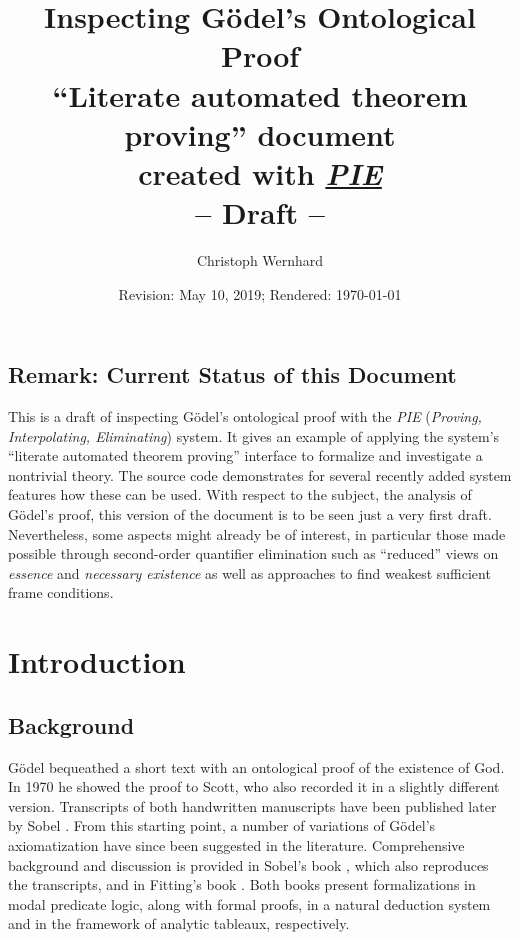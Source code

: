 \documentclass[a4paper]{article}
\newcommand{\name}[1]{\textit{#1}}
\begin{document}
%
%
 \title{Inspecting Gödel's Ontological Proof\\
 {\Large ``Literate automated theorem proving'' document\\ created with
  \name{\href{http://cs.christophwernhard.com/pie}{PIE}}}\\
  -- Draft --}
  \author{Christoph Wernhard}
  \date{Revision: May 10, 2019; Rendered: \today}
  \maketitle

%
%
  \tableofcontents
%
%
\subsection*{Remark: Current Status of this Document}

  This is a draft of inspecting Gödel's ontological proof with the \name{PIE}
  (\name{Proving, Interpolating, Eliminating}) system.  It gives an example of
  applying the system's ``literate automated theorem proving'' interface to
  formalize and investigate a nontrivial theory. The source code demonstrates
  for several recently added system features how these can be used.  With
  respect to the subject, the analysis of Gödel's proof, this version of the
  document is to be seen just a very first draft. Nevertheless, some aspects
  might already be of interest, in particular those made possible through
  second-order quantifier elimination such as ``reduced'' views on
  \name{essence} and \name{necessary existence} as well as approaches to find
  weakest sufficient frame conditions.
  
%
%
  \section{Introduction}

  \subsection{Background}
  
  Gödel bequeathed a short text with an ontological proof of the existence of
  God.  In 1970 he showed the proof to Scott, who also recorded it in a
  slightly different version. Transcripts of both handwritten manuscripts have
  been published later by Sobel \cite{sobel:1987:goedel}. From this starting
  point, a number of variations of Gödel's axiomatization have since been
  suggested in the literature.  Comprehensive background and discussion is
  provided in Sobel's book \cite{sobel:theism}, which also reproduces the
  transcripts, and in Fitting's book \cite{fitting:god}.  Both books present
  formalizations in modal predicate logic, along with formal proofs, in a
  natural deduction system and in the framework of analytic tableaux,
  respectively.
\end{document}
